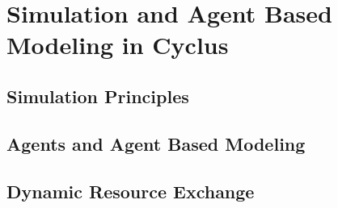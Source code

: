 \chapter{Simulation and Agent Based Modeling in Cyclus}\label{ch:abm}

\section{Simulation Principles}

\section{Agents and Agent Based Modeling}

\section{Dynamic Resource Exchange}
